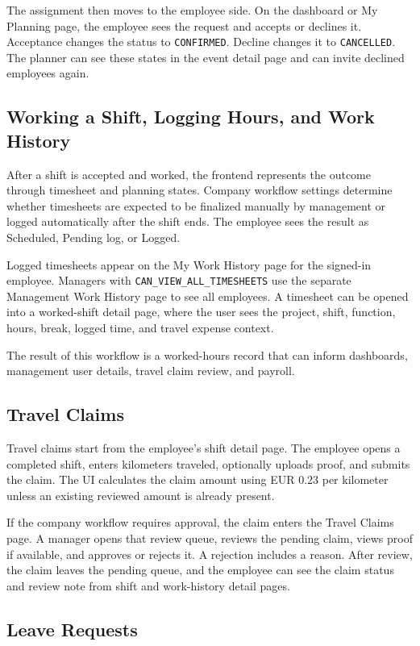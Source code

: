 \documentclass[11pt]{article}
\newcommand{\code}[1]{\nolinkurl{#1}}
\begin{document}
The assignment then moves to the employee side. On the dashboard or My Planning page, the employee sees the request and accepts or declines it. Acceptance changes the status to \code{CONFIRMED}. Decline changes it to \code{CANCELLED}. The planner can see these states in the event detail page and can invite declined employees again.

\subsection{Working a Shift, Logging Hours, and Work History}

After a shift is accepted and worked, the frontend represents the outcome through timesheet and planning states. Company workflow settings determine whether timesheets are expected to be finalized manually by management or logged automatically after the shift ends. The employee sees the result as Scheduled, Pending log, or Logged.

Logged timesheets appear on the My Work History page for the signed-in employee. Managers with \code{CAN_VIEW_ALL_TIMESHEETS} use the separate Management Work History page to see all employees. A timesheet can be opened into a worked-shift detail page, where the user sees the project, shift, function, hours, break, logged time, and travel expense context.

The result of this workflow is a worked-hours record that can inform dashboards, management user details, travel claim review, and payroll.

\subsection{Travel Claims}

Travel claims start from the employee's shift detail page. The employee opens a completed shift, enters kilometers traveled, optionally uploads proof, and submits the claim. The UI calculates the claim amount using EUR 0.23 per kilometer unless an existing reviewed amount is already present.

If the company workflow requires approval, the claim enters the Travel Claims page. A manager opens that review queue, reviews the pending claim, views proof if available, and approves or rejects it. A rejection includes a reason. After review, the claim leaves the pending queue, and the employee can see the claim status and review note from shift and work-history detail pages.

\subsection{Leave Requests}
\end{document}
